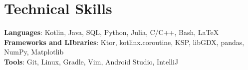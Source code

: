 \documentclass[letterpaper,11pt]{article}
\begin{document}
%
\section{Technical Skills}
 \begin{itemize}[leftmargin=0.15in, label={}]
    \small{\item{
     \textbf{Languages}{: Kotlin, Java, SQL, Python, Julia, C/C++, Bash, LaTeX} \\
     \textbf{Frameworks and LIbraries}{: Ktor, kotlinx.coroutine, KSP, libGDX, pandas, NumPy, Matplotlib} \\
     \textbf{Tools}{: Git, Linux, Gradle, Vim, Android Studio, IntelliJ} \\
    }}
 \end{itemize}


\end{document}
